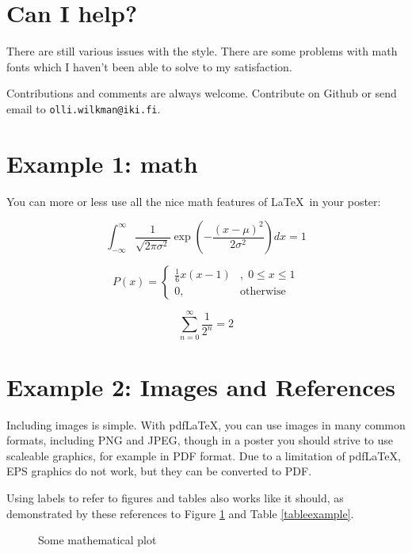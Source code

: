 \documentclass[a0paper,smallertitle]{HYposter}
\newcommand{\url}[1]{\texttt{#1}}
\begin{document}
\section*{Can I help?}
There are still various issues with the style. There are some problems with math fonts which I haven't been able to solve to my satisfaction.

Contributions and comments are always welcome. Contribute on Github or send email to \url{olli.wilkman@iki.fi}.



\section*{Example 1: math}
You can more or less use all the nice math features of \LaTeX~in your poster:

\begin{equation}
    \int_{-\infty}^{\infty} \frac{1}{\sqrt{2 \pi \sigma^2}} \exp\left(-\frac{(x - \mu)^2}{2 \sigma^2} \right) dx = 1
\end{equation}

\begin{equation}
    P(x) = \left\{ \begin{array}{lr} \frac{1}{6}x(x-1)&,\; 0 \leq x \leq 1 \\ 0, & \text{otherwise}  \end{array} \right.
\end{equation}

\begin{equation}
    \sum_{n=0}^\infty \frac{1}{2^n} = 2
\end{equation}



\section*{Example 2: Images and References}
Including images is simple.  With pdf\LaTeX, you can use images in many common formats, including PNG and JPEG, though in a poster you should strive to use scaleable graphics, for example in PDF format. Due to a limitation of pdf\LaTeX, EPS graphics do not work, but they can be converted to PDF.
    
Using labels to refer to figures and tables also works like it should, as demonstrated by these references to Figure \ref{examplefigure} and Table \ref{tableexample}.

\begin{figure}[H]
\caption{Some mathematical plot \label{examplefigure}}
\end{figure}
\end{document}
